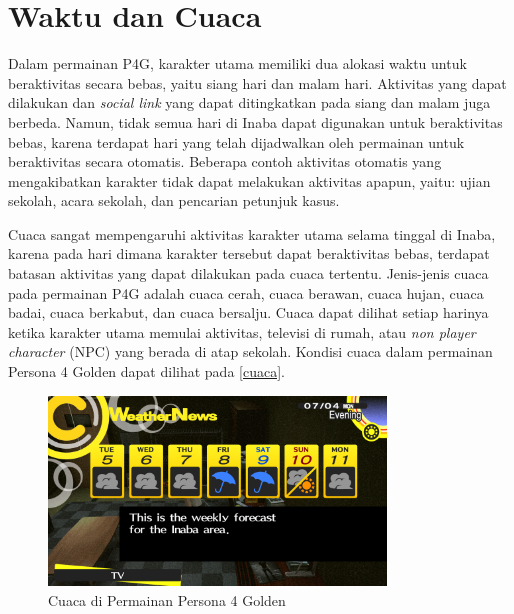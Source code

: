 

\section{Waktu dan Cuaca}
Dalam permainan P4G, karakter utama memiliki dua alokasi waktu untuk beraktivitas secara bebas, yaitu siang hari dan malam hari. Aktivitas yang dapat dilakukan dan \textit{social link} yang dapat ditingkatkan pada siang dan malam juga berbeda.
Namun, tidak semua hari di Inaba dapat digunakan untuk beraktivitas bebas, karena terdapat hari yang telah dijadwalkan oleh permainan untuk beraktivitas secara otomatis.
Beberapa contoh aktivitas otomatis yang mengakibatkan karakter tidak dapat melakukan aktivitas apapun, yaitu: ujian sekolah, acara sekolah, dan pencarian petunjuk kasus.

Cuaca sangat mempengaruhi aktivitas karakter utama selama tinggal di Inaba, karena pada hari dimana karakter tersebut dapat beraktivitas bebas, terdapat batasan aktivitas yang dapat dilakukan pada cuaca tertentu. Jenis-jenis cuaca pada permainan P4G adalah cuaca cerah, cuaca berawan, cuaca hujan, cuaca badai, cuaca berkabut, dan cuaca bersalju. Cuaca dapat dilihat setiap harinya ketika karakter utama memulai aktivitas, televisi di rumah, atau \textit{non player character} (NPC) yang berada di atap sekolah. Kondisi cuaca dalam permainan Persona 4 Golden dapat dilihat pada \autoref{cuaca}.

\begin{figure}[htbp]
    \centering
    \includegraphics[width=0.8\textwidth]{resources/Dokumentasi/Screenshot (461).png}
    \caption{\label{cuaca}Cuaca di Permainan Persona 4 Golden}
\end{figure}

